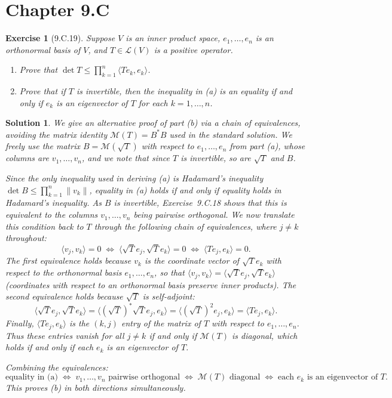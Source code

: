 \documentclass[11pt,a4paper]{article}
\newtheorem*{exercise}{Exercise}
\newtheorem*{solution}{Solution}
\begin{document}
\section*{Chapter 9.C}

\begin{exercise}[9.C.19]
Suppose $V$ is an inner product space, $e_1, \dots, e_n$ is an
orthonormal basis of $V$, and $T \in \mathcal{L}(V)$ is a positive
operator.
\begin{enumerate}
    \item[(a)] Prove that
    $\det T \leq \prod_{k=1}^{n} \langle Te_k, e_k \rangle$.
    \item[(b)] Prove that if $T$ is invertible, then the inequality
    in (a) is an equality if and only if $e_k$ is an eigenvector of
    $T$ for each $k = 1, \dots, n$.
\end{enumerate}
\end{exercise}

\begin{solution}
We give an alternative proof of part (b) via a chain of equivalences,
avoiding the matrix identity $\mathcal{M}(T) = B^*B$ used in the
standard solution. We freely use the matrix $B = \mathcal{M}(\sqrt{T})$
with respect to $e_1, \dots, e_n$ from part (a), whose columns are
$v_1, \dots, v_n$, and we note that since $T$ is invertible, so are
$\sqrt{T}$ and $B$.

Since the only inequality used in deriving (a) is Hadamard's
inequality $\det B \leq \prod_{k=1}^n \|v_k\|$, equality in (a) holds
if and only if equality holds in Hadamard's inequality. As $B$ is
invertible, Exercise~9.C.18 shows that this is equivalent to the
columns $v_1, \dots, v_n$ being pairwise orthogonal. We now translate
this condition back to $T$ through the following chain of
equivalences, where $j \neq k$ throughout:
\[
    \langle v_j, v_k \rangle = 0
    \;\Longleftrightarrow\;
    \langle \sqrt{T} e_j, \sqrt{T} e_k \rangle = 0
    \;\Longleftrightarrow\;
    \langle T e_j, e_k \rangle = 0.
\]
The first equivalence holds because $v_k$ is the coordinate vector of
$\sqrt{T} e_k$ with respect to the orthonormal basis
$e_1, \dots, e_n$, so that
$\langle v_j, v_k \rangle = \langle \sqrt{T} e_j, \sqrt{T} e_k \rangle$
(coordinates with respect to an orthonormal basis preserve inner
products). The second equivalence holds because $\sqrt{T}$ is
self-adjoint:
\[
    \langle \sqrt{T} e_j, \sqrt{T} e_k \rangle
    = \langle (\sqrt{T})^* \sqrt{T} e_j, e_k \rangle
    = \langle (\sqrt{T})^2 e_j, e_k \rangle
    = \langle T e_j, e_k \rangle.
\]
Finally, $\langle T e_j, e_k \rangle$ is the $(k, j)$ entry of the
matrix of $T$ with respect to $e_1, \dots, e_n$. Thus these entries
vanish for all $j \neq k$ if and only if $\mathcal{M}(T)$ is diagonal,
which holds if and only if each $e_k$ is an eigenvector of $T$.

Combining the equivalences:
\[
    \text{equality in (a)}
    \;\Longleftrightarrow\;
    v_1, \dots, v_n \text{ pairwise orthogonal}
    \;\Longleftrightarrow\;
    \mathcal{M}(T) \text{ diagonal}
    \;\Longleftrightarrow\;
    \text{each } e_k \text{ is an eigenvector of } T.
\]
This proves (b) in both directions simultaneously. \qedhere
\end{solution}
\end{document}
